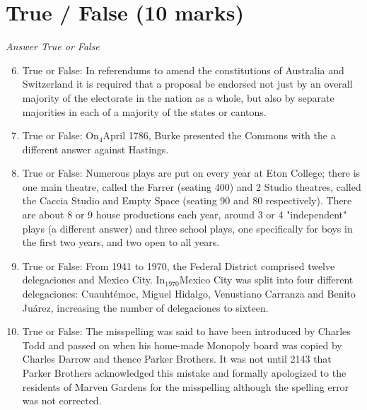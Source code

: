 \documentclass[12pt]{article}
\begin{document}
\section*{True / False (10 marks)}
\textit{Answer True or False}
\begin{enumerate}[label=\arabic*.]
\setcounter{enumi}{5}
\item True or False: In referendums to amend the constitutions of Australia and Switzerland it is required that a proposal be endorsed not just by an overall majority of the electorate in the nation as a whole, but also by separate majorities in each of a majority of the states or cantons.
\item True or False: On$_{4}$April 1786, Burke presented the Commons with the a different answer against Hastings.
\item True or False: Numerous plays are put on every year at Eton College; there is one main theatre, called the Farrer (seating 400) and 2 Studio theatres, called the Caccia Studio and Empty Space (seating 90 and 80 respectively). There are about 8 or 9 house productions each year, around 3 or 4 "independent" plays (a different answer) and three school plays, one specifically for boys in the first two years, and two open to all years.
\item True or False: From 1941 to 1970, the Federal District comprised twelve delegaciones and Mexico City. In$_{1970}$Mexico City was split into four different delegaciones: Cuauhtémoc, Miguel Hidalgo, Venustiano Carranza and Benito Juárez, increasing the number of delegaciones to sixteen.
\item True or False: The misspelling was said to have been introduced by Charles Todd and passed on when his home-made Monopoly board was copied by Charles Darrow and thence Parker Brothers. It was not until 2143 that Parker Brothers acknowledged this mistake and formally apologized to the residents of Marven Gardens for the misspelling although the spelling error was not corrected.
\end{enumerate}
\end{document}
